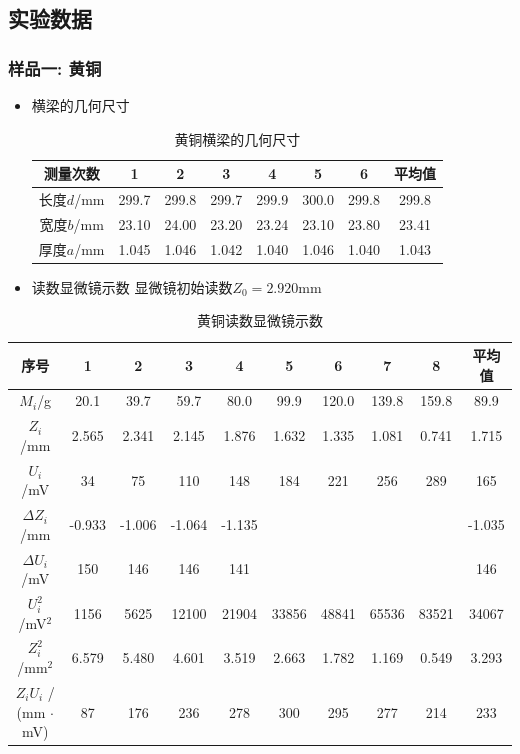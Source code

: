 \documentclass[zihao=5, UTF8]{article}
\theoremstyle{MyLineTheoremStyle} %
\theoremstyle{MyBlockTheoremStyle} %
\theoremstyle{MySubsubsectionStyle} %
\begin{document}
\subsection{实验数据}
\subsubsection{样品一: 黄铜}
\begin{itemize}
    \item 横梁的几何尺寸
        \begin{table}[H]
        \centering
        \begin{tabular}{|c|c|c|c|c|c|c|c|} 
        \hline
        测量次数   & 1     & 2     & 3     & 4     & 5     & 6     & 平均值    \\ 
        \hline
        长度$d$/mm & 299.7 & 299.8 & 299.7 & 299.9 & 300.0 & 299.8 & 299.8  \\ 
        \hline
        宽度$b$/mm & 23.10 & 24.00 & 23.20 & 23.24 & 23.10 & 23.80 & 23.41  \\ 
        \hline
        厚度$a$/mm & 1.045 & 1.046 & 1.042 & 1.040 & 1.046 & 1.040 & 1.043  \\
        \hline
        \end{tabular}
        \caption{黄铜横梁的几何尺寸}
        \end{table}
    \item 读数显微镜示数
    显微镜初始读数$Z_0 = 2.920$mm
\end{itemize}
\begin{table}[H]
\centering
\begin{tabular}{|c|c|c|c|c|c|c|c|c|c|} 
\hline
序号                                & 1      & 2      & 3      & 4      & 5     & 6     & 7     & 8     & 平均值     \\ 
\hline
$M_i$/g                        & 20.1   & 39.7  & 59.7   & 80.0     & 99.9  & 120.0   & 139.8 & 159.8 & 89.9   \\ 
\hline
$Z_i$/mm                       & 2.565  & 2.341  & 2.145  & 1.876  & 1.632 & 1.335 & 1.081 & 0.741 & 1.715   \\ 
\hline
$U_i$/mV                       & 34     & 75     & 110    & 148    & 184   & 221   & 256   & 289   & 165     \\ 
\hline
$\Delta Z_i$/mm                & -0.933 & -1.006 & -1.064 & -1.135 &       &       &       &       & -1.035  \\ 
\hline
$\Delta U_i$/mV                & 150    & 146    & 146    & 141    &       &       &       &       & 146     \\ 
\hline
$U_i^2$ /mV$^2$ & 1156   & 5625   & 12100  & 21904  & 33856 & 48841 & 65536 & 83521 & 34067   \\ 
\hline
 $Z_i^2$ /mm$^2$   & 6.579  & 5.480  & 4.601  & 3.519  & 2.663 & 1.782 & 1.169 & 0.549 & 3.293   \\ 
\hline
$Z_iU_i$ / (mm $\cdot$ mV)  & 87     & 176    & 236    & 278    & 300   & 295   & 277   & 214   & 233     \\ 
\hline
\end{tabular}
\caption{黄铜读数显微镜示数}
\end{table}
\end{document}
